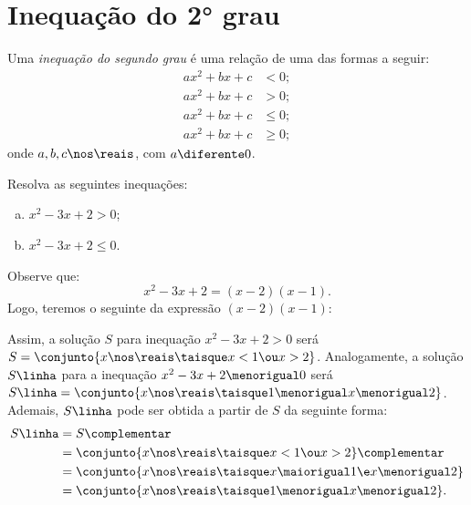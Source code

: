 \section{Inequação do 2° grau}

\begin{definition}
    Uma \emph{inequação do segundo grau} é uma relação de uma das formas
    a seguir:
    \begin{align*}
        ax^2 + bx + c &< 0;   \\
        ax^2 + bx + c &> 0;   \\
        ax^2 + bx + c &\le 0; \\
        ax^2 + bx + c &\ge 0;
    \end{align*}
    onde $a, b, c \nos \reais$, com $a \diferente 0$.
\end{definition}

\begin{example}
    Resolva as seguintes inequações:
    \begin{enumerate}[a)]
        \item $x^2 -3x +2 > 0$;
        \item $x^2 -3x +2 \le 0$.
    \end{enumerate}
\end{example}

\begin{solution}
    Observe que: 
    \[
        x^2 - 3x + 2 = (x-2)(x-1).
    \]
    Logo, teremos o seguinte  da expressão $(x-2)(x-1)$:
    \begin{figure}[H]
        \centering
        \caption{}
    \end{figure}

    Assim, a solução $S$ para inequação $x^2 -3x +2 > 0$ será $S = \conjunto{ x \nos \reais \taisque x < 1 \ou x > 2 }$. Analogamente, a solução $S\linha$ para a inequação $x^2 - 3x + 2 \menorigual 0$ será $S\linha = \conjunto{ x \nos \reais \taisque 1 \menorigual x \menorigual 2 }$. Ademais, $S\linha$ pode ser obtida a partir de $S$ da seguinte forma:
    \begin{align*}
        S\linha &= S\complementar \\ 
                &= \conjunto{ x \nos \reais \taisque x < 1 \ou x > 2 }\complementar \\ 
                &= \conjunto{ x \nos \reais \taisque x \maiorigual 1 \e x \menorigual 2 } \\ 
                &= \conjunto{ x \nos \reais \taisque 1 \menorigual x \menorigual 2 }.
    \end{align*}
\end{solution}


